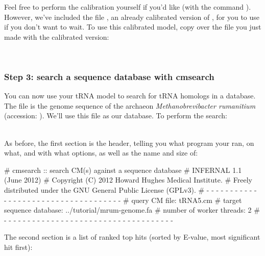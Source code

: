 Feel free to perform the calibration yourself if you'd like (with the
command ). However, we've included the file
, an already calibrated version of ,
for you to use if you don't want to wait. To use this calibrated
model, copy over the  file you just made with the
calibrated version:
 
\\
 
\subsubsection{Step 3: search a sequence database with cmsearch}

You can now use your tRNA model to search for tRNA homologs in a
database. The file  is the genome sequence of the
archaeon \emph{Methanobrevibacter rumanitium} (accession:
). We'll use this file as our database. To perform
the search:

\\

As before, the first section is the header, telling you what program
your ran, on what, and with what options, as well as the name and size
of:

\begin{sreoutput}
# cmsearch :: search CM(s) against a sequence database
# INFERNAL 1.1 (June 2012)
# Copyright (C) 2012 Howard Hughes Medical Institute.
# Freely distributed under the GNU General Public License (GPLv3).
# - - - - - - - - - - - - - - - - - - - - - - - - - - - - - - - - - - - -
# query CM file:                         tRNA5.cm
# target sequence database:              ../tutorial/mrum-genome.fa
# number of worker threads:              2
# - - - - - - - - - - - - - - - - - - - - - - - - - - - - - - - - - - - -
\end{sreoutput}

The second section is a list of ranked top hits (sorted by E-value,
most significant hit first):

